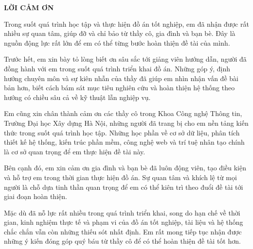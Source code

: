 \documentclass[../DoAn.tex]{subfiles}
\begin{document}
\begin{center}
    \Large{\textbf{LỜI CẢM ƠN}}\\
\end{center}
\vspace{1cm}
Trong suốt quá trình học tập và thực hiện đồ án tốt nghiệp, em đã nhận được rất nhiều sự quan tâm, giúp đỡ và chỉ bảo từ thầy cô, gia đình và bạn bè. Đây là nguồn động lực rất lớn để em có thể từng bước hoàn thiện đề tài của mình.

Trước hết, em xin bày tỏ lòng biết ơn sâu sắc tới giảng viên hướng dẫn, người đã đồng hành với em trong suốt quá trình triển khai đồ án. Những góp ý, định hướng chuyên môn và sự kiên nhẫn của thầy đã giúp em nhìn nhận vấn đề bài bản hơn, biết cách bám sát mục tiêu nghiên cứu và hoàn thiện hệ thống theo hướng có chiều sâu cả về kỹ thuật lẫn nghiệp vụ.

Em cũng xin chân thành cảm ơn các thầy cô trong Khoa Công nghệ Thông tin, Trường Đại học Xây dựng Hà Nội, những người đã trang bị cho em nền tảng kiến thức trong suốt quá trình học tập. Những học phần về cơ sở dữ liệu, phân tích thiết kế hệ thống, kiến trúc phần mềm, công nghệ web và trí tuệ nhân tạo chính là cơ sở quan trọng để em thực hiện đề tài này.

Bên cạnh đó, em xin cảm ơn gia đình và bạn bè đã luôn động viên, tạo điều kiện và hỗ trợ em trong thời gian thực hiện đồ án. Sự quan tâm và khích lệ từ mọi người là chỗ dựa tinh thần quan trọng để em có thể kiên trì theo đuổi đề tài tới giai đoạn hoàn thiện.

Mặc dù đã nỗ lực rất nhiều trong quá trình triển khai, song do hạn chế về thời gian, kinh nghiệm thực tế và phạm vi của đồ án tốt nghiệp, tài liệu và hệ thống chắc chắn vẫn còn những thiếu sót nhất định. Em rất mong tiếp tục nhận được những ý kiến đóng góp quý báu từ thầy cô để có thể hoàn thiện đề tài tốt hơn.
\end{document}
